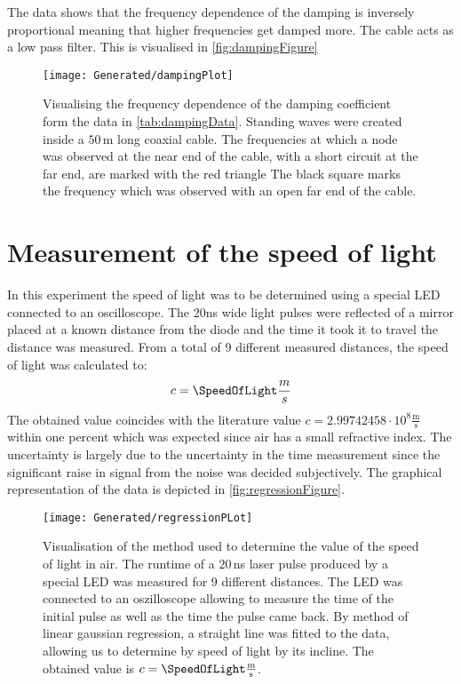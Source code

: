 \documentclass[a4paper,10pt,twocolumn]{article}
\begin{document}
    The data shows that the frequency dependence of the damping is inversely proportional meaning that higher frequencies get damped more.
    The cable acts as a low pass filter.
    This is visualised in \autoref{fig:dampingFigure}
    \begin{figure}
    \begin{center}
        \texttt{[image: Generated/dampingPlot]}
        \caption[]{Visualising the frequency dependence of the damping coefficient form the data in \autoref{tab:dampingData}.
        Standing waves were created inside a $50\,$m long coaxial cable.
        The frequencies at which a node was observed at the near end of the cable, with a short circuit at the far end, are marked with the red triangle
        The black square marks the frequency which was observed with an open far end of the cable.}   %
        \label{fig:dampingFigure}
    \end{center}
    \end{figure}
    
    \section{Measurement of the speed of light}
    \label{sec:speedOfLightMeasurement}
    In this experiment the speed of light was to be determined using a special LED connected to an oscilloscope.
    The 20ns wide light pulses were reflected of a mirror placed at a known distance from the diode and the time it took it to travel the distance was measured.
    From a total of 9 different measured distances, the speed of light was calculated to:
    \begin{align}
        c = \SpeedOfLight \frac{m}{s}
    \end{align}
    The obtained value coincides with the literature value \parencite{codata} $c  = 2.99742458\cdot10^8 \frac{\text{m}}{\text{s}}$ within one percent which was expected since air has a small refractive index.
    The uncertainty is largely due to the uncertainty in the time measurement since the significant raise in signal from the noise was decided subjectively.
    The graphical representation of the data is depicted in \autoref{fig:regressionFigure}.
    \begin{figure}
        \begin{center}
            \texttt{[image: Generated/regressionPLot]}
            \caption[]{Visualisation of the method used to determine the value of the speed of light in air.
            The runtime of a $20\,$ns laser pulse produced by a special LED was measured for 9 different distances.
            The LED was connected to an oszilloscope allowing to measure the time of the initial pulse as well as the time the pulse came back.
            By method of linear gaussian regression, a straight line was fitted to the data, allowing us to determine by speed of light by its incline.
            The obtained value is $c =\SpeedOfLight \frac{\text{m}}{\text{s}}$.
            }   %
            \label{fig:regressionFigure}
        \end{center}
    \end{figure}
\end{document}
